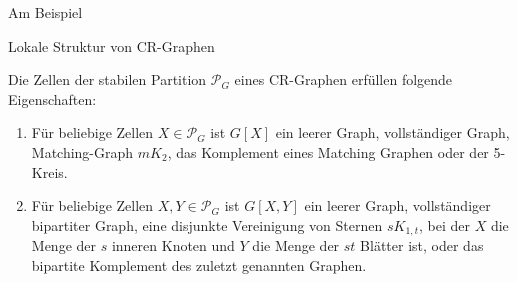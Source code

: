 \documentclass{beamer}
\begin{document}
\begin{frame}{Am Beispiel }
	\end{frame}
	\begin{frame}{Lokale Struktur von CR-Graphen}
		\begin{Lemma}
			Die Zellen der stabilen Partition $\mathcal{P}_G$ eines CR-Graphen erfüllen folgende Eigenschaften:
			
			\begin{enumerate}[label=(\Alph*)]
				\item Für beliebige Zellen $X\in \mathcal{P}_G$ ist $G[X]$ ein \alert{leerer Graph}, \alert{vollständiger Graph}, \alert{Matching-Graph} $mK_2$, das \alert{Komplement eines Matching Graphen} oder der \alert{5-Kreis}.
				\item Für beliebige Zellen $X,Y\in \mathcal{P}_G$ ist $G[X,Y]$ ein \alert{leerer Graph}, \alert{vollständiger bipartiter Graph}, eine \alert{disjunkte Vereinigung von Sternen} $sK_{1,t}$, bei der $X$ die Menge der $s$ inneren Knoten und $Y$ die Menge der $st$ Blätter ist, oder das \alert{bipartite Komplement des zuletzt genannten Graphen}.
			\end{enumerate}
		\end{Lemma}
	\end{frame}
\end{document}
